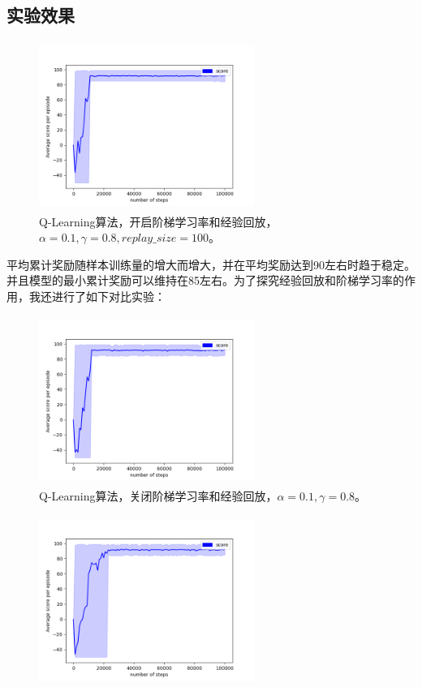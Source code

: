 \documentclass[a4paper,12pt]{article}
\begin{document}
\begin{CJK}{UTF8}{gbsn}
\section{实验效果}
\begin{figure}[h!]
	\centering
	\includegraphics[width=7cm,height=5.5cm]{./code/performance.png}
	\caption{Q-Learning算法，开启阶梯学习率和经验回放，$\alpha=0.1,\gamma=0.8,replay\_size=100$。}
	\label{performance}
	\vspace{-0.3cm}
\end{figure}
平均累计奖励随样本训练量的增大而增大，并在平均奖励达到90左右时趋于稳定。并且模型的最小累计奖励可以维持在85左右。为了探究经验回放和阶梯学习率的作用，我还进行了如下对比实验：
\begin{figure}[h!]
	\centering
	\includegraphics[width=7cm,height=5.5cm]{./code/performance_al=0.1_ga=0.8.png}
	\caption{Q-Learning算法，关闭阶梯学习率和经验回放，$\alpha=0.1,\gamma=0.8$。}
	\label{performance}
	\vspace{-0.3cm}
\end{figure}
\begin{figure}[h!]
	\centering
	\includegraphics[width=7cm,height=5.5cm]{./code/performance_al=0.1_ga=0.8_rs=100.png}

\end{figure}
\end{CJK}
\end{document}
